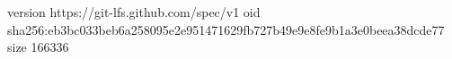 version https://git-lfs.github.com/spec/v1
oid sha256:eb3bc033beb6a258095e2e951471629fb727b49e9e8fe9b1a3e0beea38dcde77
size 166336
